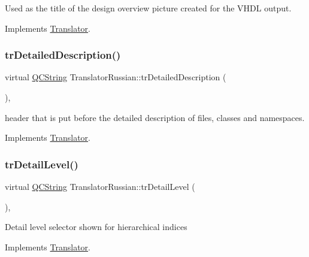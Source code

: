 Used as the title of the design overview picture created for the V\+H\+DL output. 

Implements \mbox{\hyperlink{class_translator}{Translator}}.

\mbox{\label{class_translator_russian_a2aa9e0ed6df6423bb1ae5d3670679513}} 
\subsubsection{\texorpdfstring{trDetailedDescription()}{trDetailedDescription()}}
{\footnotesize\ttfamily virtual \mbox{\hyperlink{class_q_c_string}{Q\+C\+String}} Translator\+Russian\+::tr\+Detailed\+Description (\begin{DoxyParamCaption}{ }\end{DoxyParamCaption})\hspace{0.3cm}{\ttfamily [inline]}, {\ttfamily [virtual]}}

header that is put before the detailed description of files, classes and namespaces. 

Implements \mbox{\hyperlink{class_translator}{Translator}}.

\mbox{\label{class_translator_russian_a9a066e4240c79ad2adde2ffefccf42c6}} 
\subsubsection{\texorpdfstring{trDetailLevel()}{trDetailLevel()}}
{\footnotesize\ttfamily virtual \mbox{\hyperlink{class_q_c_string}{Q\+C\+String}} Translator\+Russian\+::tr\+Detail\+Level (\begin{DoxyParamCaption}{ }\end{DoxyParamCaption})\hspace{0.3cm}{\ttfamily [inline]}, {\ttfamily [virtual]}}

Detail level selector shown for hierarchical indices 

Implements \mbox{\hyperlink{class_translator}{Translator}}.

\mbox{\label{class_translator_russian_ab724c0d8dff2b2ca3cae95fbe289022f}} 
